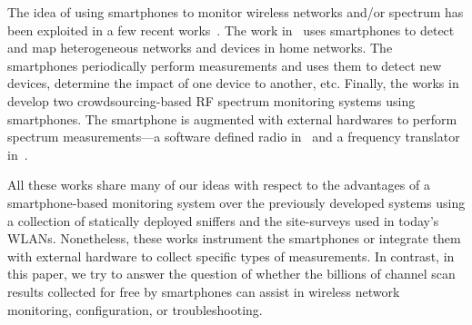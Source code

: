 The idea of using smartphones to monitor wireless networks and/or spectrum has
been exploited in a few recent
works~\cite{nychis:hotwireless2014,nika:hotwireless2014,zhang:hotmobile2015}.
The work in~\cite{nychis:hotwireless2014} uses smartphones to detect and map
heterogeneous networks and devices in home networks. The smartphones
periodically perform measurements and uses them to detect new devices,
determine the impact of one device to another, etc. Finally, the works
in~\cite{nika:hotwireless2014,zhang:hotmobile2015} develop two
crowdsourcing-based RF spectrum monitoring systems using smartphones. The
smartphone is augmented with external hardwares to perform spectrum
measurements---a software defined radio in~\cite{nika:hotwireless2014} and a
frequency translator in~\cite{zhang:hotmobile2015}.

All these works share many of our ideas with respect to the advantages
of a smartphone-based monitoring system over the previously developed
systems using a collection of statically deployed sniffers and the
site-surveys used in today's WLANs. Nonetheless, these works
instrument the smartphones or integrate them with external hardware to
collect specific types of measurements. In contrast, in this paper, we
try to answer the question of whether the billions of \wifi{} channel
scan results collected for free by smartphones can assist in wireless
network monitoring, configuration, or troubleshooting.
